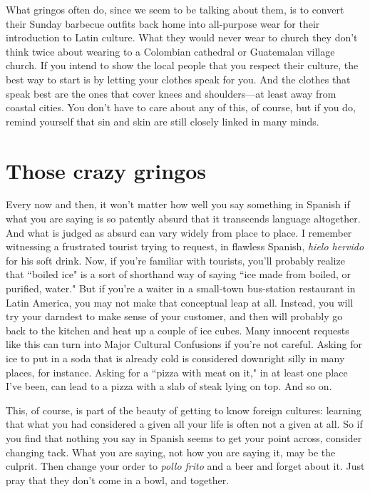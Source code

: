 What gringos often do, since we seem to be talking about
them, is to convert their Sunday barbecue outfits back home into all-purpose wear for their introduction to Latin culture. What they would
never wear to church they don't think twice about wearing to a Colombian cathedral or Guatemalan village church. If you intend to show the
local people that you respect their culture, the best way to start is by
letting your clothes speak for you. And the clothes that speak best are
the ones that cover knees and shoulders---at least away from coastal
cities. You don't have to care about any of this, of course, but if you
do, remind yourself that sin and skin are still closely linked in many
minds.

\section{Those crazy gringos}

Every now and then, it won't matter how well you say something in Spanish if what you are saying is so patently absurd that it
transcends language altogether. And what is judged as absurd can vary
widely from place to place. I remember witnessing a frustrated tourist trying to request, in flawless Spanish, \emph{hielo hervido} for his soft
drink. Now, if you're familiar with tourists, you'll probably realize that
``boiled ice" is a sort of shorthand way of saying ``ice made from boiled,
or purified, water." But if you're a waiter in a small-town bus-station
restaurant in Latin America, you may not make that conceptual leap at
all. Instead, you will try your darndest to make sense of your customer,
and then will probably go back to the kitchen and heat up a couple of
ice cubes. Many innocent requests like this can turn into Major Cultural Confusions if you're not careful. Asking for ice to put in a soda
that is already cold is considered downright silly in many places, for
instance. Asking for a ``pizza with meat on it," in at least one place I've
been, can lead to a pizza with a slab of steak lying on top. And so on.

This, of course, is part of the beauty of getting to know foreign
cultures: learning that what you had considered a given all your life is
often not a given at all. So if you find that nothing you say in Spanish
seems to get your point across, consider changing tack. What you are
saying, not how you are saying it, may be the culprit. Then change
your order to \emph{pollo frito} and a beer and forget about it. Just pray that
they don't come in a bowl, and together.

